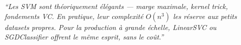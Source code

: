 \documentclass[12pt,a4paper]{article}
\begin{document}
\vspace{1em}
\begin{center}
\begin{tcolorbox}[
  enhanced, width=0.75\textwidth,
  colback=svmpurple!8, colframe=svmpurple,
  boxrule=0.8pt, arc=4pt
]
\centering
\small\itshape
``Les SVM sont théoriquement élégants — marge maximale, kernel trick, fondements VC. En pratique, leur complexité $O(n^3)$ les réserve aux petits datasets propres. Pour la production à grande échelle, LinearSVC ou SGDClassifier offrent le même esprit, sans le coût.''
\end{tcolorbox}
\end{center}

\end{document}
